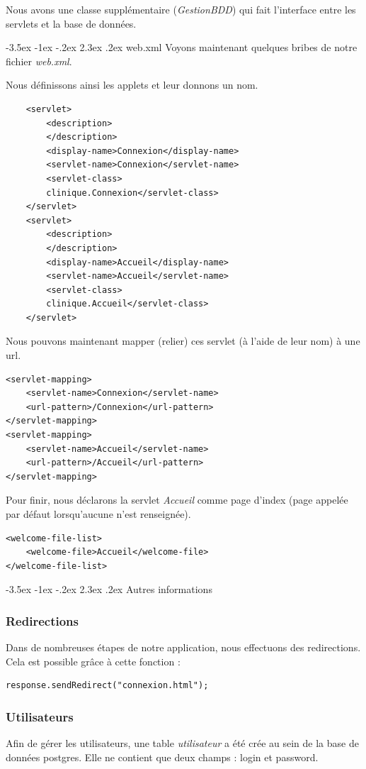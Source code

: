 \documentclass[a4paper,12pt]{article}
\makeatletter
\renewcommand\section{\@startsection {section}{1}{\z@}%
                           {-3.5ex \@plus -1ex \@minus -.2ex}%
                           {2.3ex \@plus.2ex}%
                           {\normalfont\Large\bfseries}}
\makeatother
\begin{document}
Nous avons une classe supplémentaire (\textit{GestionBDD}) qui fait l'interface entre les servlets et la base de données.

\section{web.xml}
Voyons maintenant quelques bribes de notre fichier \textit{web.xml}.


Nous définissons ainsi les applets et leur donnons un nom.
\begin{lstlisting}
	<servlet>
		<description>
		</description>
		<display-name>Connexion</display-name>
		<servlet-name>Connexion</servlet-name>
		<servlet-class>
		clinique.Connexion</servlet-class>
	</servlet>
	<servlet>
		<description>
		</description>
		<display-name>Accueil</display-name>
		<servlet-name>Accueil</servlet-name>
		<servlet-class>
		clinique.Accueil</servlet-class>
	</servlet>
\end{lstlisting}
Nous pouvons maintenant \og mapper \fg{} (relier) ces servlet (à l'aide de leur nom) à une url.
\begin{lstlisting}
<servlet-mapping>
	<servlet-name>Connexion</servlet-name>
	<url-pattern>/Connexion</url-pattern>
</servlet-mapping>
<servlet-mapping>
	<servlet-name>Accueil</servlet-name>
	<url-pattern>/Accueil</url-pattern>
</servlet-mapping>
\end{lstlisting}
Pour finir, nous déclarons la servlet \textit{Accueil} comme page d'index (page appelée par défaut lorsqu'aucune n'est renseignée).
\begin{lstlisting}
<welcome-file-list>
	<welcome-file>Accueil</welcome-file>
</welcome-file-list>
\end{lstlisting}

\newpage
\section{Autres informations}
\subsubsection{Redirections}
Dans de nombreuses étapes de notre application, nous effectuons des redirections. Cela est possible grâce à cette fonction :
\begin{lstlisting}
response.sendRedirect("connexion.html");
\end{lstlisting}

\subsubsection{Utilisateurs}
Afin de gérer les utilisateurs, une table \textit{utilisateur} a été crée au sein de la base de données postgres. Elle ne contient que deux champs : login et password.
\end{document}
